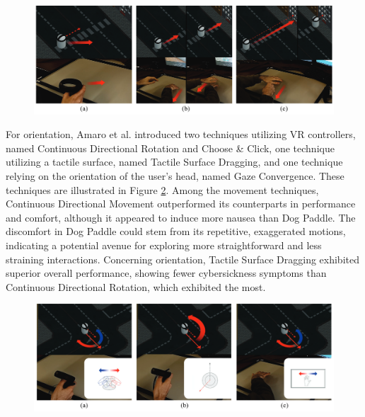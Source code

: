     \begin{figure}[h!]
        \centering
        \includegraphics[width=1\textwidth]{figures/sota_travel.png}
        \label{fig:sota_travel}
    \end{figure}

    For orientation, Amaro et al. \cite{amaroDesignEvaluationTravel2022} introduced two techniques utilizing VR controllers, named Continuous Directional Rotation and Choose \& Click, one technique utilizing a tactile surface, named Tactile Surface Dragging, and one technique relying on the orientation of the user's head, named Gaze Convergence. These techniques are illustrated in Figure \ref{fig:sota_orientation}. Among the movement techniques, Continuous Directional Movement outperformed its counterparts in performance and comfort, although it appeared to induce more nausea than Dog Paddle. The discomfort in Dog Paddle could stem from its repetitive, exaggerated motions, indicating a potential avenue for exploring more straightforward and less straining interactions. Concerning orientation, Tactile Surface Dragging exhibited superior overall performance, showing fewer cybersickness symptoms than Continuous Directional Rotation, which exhibited the most.

    \begin{figure}[h!]
        \centering
        \includegraphics[width=1\textwidth]{figures/sota_orientation.png}
        \label{fig:sota_orientation}
    \end{figure}


